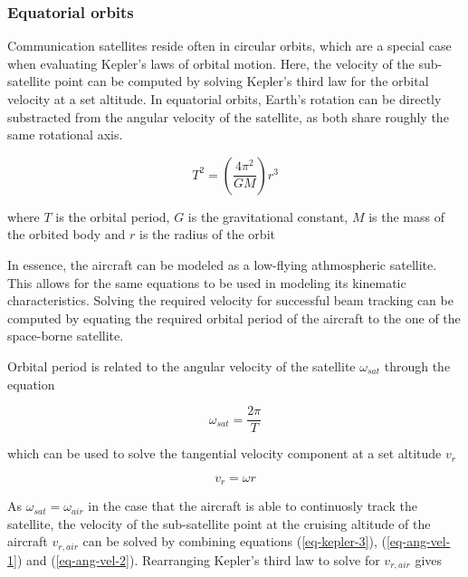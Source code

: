 \documentclass[english, 12pt, a4paper, elec, utf8, a-1b, online]{aaltothesis}
\begin{document}
\subsubsection{Equatorial orbits}

Communication satellites reside often in circular orbits, which are a special case when evaluating Kepler's laws of orbital motion.
Here, the velocity of the sub-satellite point can be computed by solving Kepler's third law for the orbital velocity at a set altitude.
In equatorial orbits, Earth's rotation can be directly substracted from the angular velocity of the satellite, as both share roughly the same rotational axis.

\begin{equation} \label{eq-kepler-3}
  T^2 = (\frac{4\pi^2}{GM})r^3
\end{equation}

where $T$ is the orbital period, $G$ is the gravitational constant, $M$ is the mass of the orbited body and $r$ is the radius of the orbit %

In essence, the aircraft can be modeled as a low-flying athmospheric satellite.
This allows for the same equations to be used in modeling its kinematic characteristics.
Solving the required velocity for successful beam tracking can be computed by equating the required orbital period of the aircraft to the one of the space-borne satellite.

Orbital period is related to the angular velocity of the satellite $\omega_{sat}$ through the equation

\begin{equation} \label{eq-ang-vel-1}
  \omega_{sat} = \frac{2\pi}{T}
\end{equation}

\noindent
which can be used to solve the tangential velocity component at a set altitude $v_r$

\begin{equation} \label{eq-ang-vel-2}
  v_r = \omega r
\end{equation}

\noindent
As $\omega_{sat} = \omega_{air}$ in the case that the aircraft is able to continuosly track the satellite, the velocity of the sub-satellite point at the cruising altitude of the aircraft $v_{r, air}$ can be solved by combining equations (\ref{eq-kepler-3}), (\ref{eq-ang-vel-1}) and (\ref{eq-ang-vel-2}).
Rearranging Kepler's third law to solve for $v_{r, air}$ gives
\end{document}
